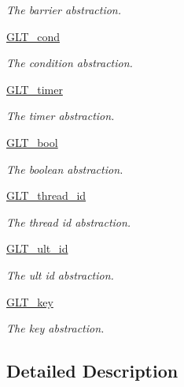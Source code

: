 \begin{DoxyCompactItemize}
\begin{DoxyCompactList}\small\item\em The barrier abstraction. \end{DoxyCompactList}\item 
\hypertarget{group__OBJECTS_ga075c19da7942eee02c7e0e55c44728ca}{\hyperlink{group__OBJECTS_ga075c19da7942eee02c7e0e55c44728ca}{G\-L\-T\-\_\-cond}}\label{group__OBJECTS_ga075c19da7942eee02c7e0e55c44728ca}

\begin{DoxyCompactList}\small\item\em The condition abstraction. \end{DoxyCompactList}\item 
\hypertarget{group__OBJECTS_ga3093d7a3e24de4e022998d4f8243f309}{\hyperlink{group__OBJECTS_ga3093d7a3e24de4e022998d4f8243f309}{G\-L\-T\-\_\-timer}}\label{group__OBJECTS_ga3093d7a3e24de4e022998d4f8243f309}

\begin{DoxyCompactList}\small\item\em The timer abstraction. \end{DoxyCompactList}\item 
\hypertarget{group__OBJECTS_ga64121a8c1742a545436e128bcbfd6131}{\hyperlink{group__OBJECTS_ga64121a8c1742a545436e128bcbfd6131}{G\-L\-T\-\_\-bool}}\label{group__OBJECTS_ga64121a8c1742a545436e128bcbfd6131}

\begin{DoxyCompactList}\small\item\em The boolean abstraction. \end{DoxyCompactList}\item 
\hypertarget{group__OBJECTS_gafd85fa9f78bc9be3fb9ae69076b03ee3}{\hyperlink{group__OBJECTS_gafd85fa9f78bc9be3fb9ae69076b03ee3}{G\-L\-T\-\_\-thread\-\_\-id}}\label{group__OBJECTS_gafd85fa9f78bc9be3fb9ae69076b03ee3}

\begin{DoxyCompactList}\small\item\em The thread id abstraction. \end{DoxyCompactList}\item 
\hypertarget{group__OBJECTS_ga589bca88e2454a81e6b0a5d96b54428f}{\hyperlink{group__OBJECTS_ga589bca88e2454a81e6b0a5d96b54428f}{G\-L\-T\-\_\-ult\-\_\-id}}\label{group__OBJECTS_ga589bca88e2454a81e6b0a5d96b54428f}

\begin{DoxyCompactList}\small\item\em The ult id abstraction. \end{DoxyCompactList}\item 
\hypertarget{group__OBJECTS_ga3fb7b155abd017c450efc283b3d6666b}{\hyperlink{group__OBJECTS_ga3fb7b155abd017c450efc283b3d6666b}{G\-L\-T\-\_\-key}}\label{group__OBJECTS_ga3fb7b155abd017c450efc283b3d6666b}

\begin{DoxyCompactList}\small\item\em The key abstraction. \end{DoxyCompactList}\end{DoxyCompactItemize}


\subsection{Detailed Description}
